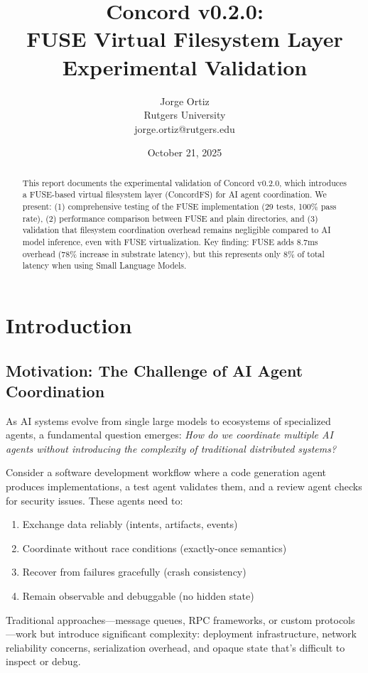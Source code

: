 \documentclass[11pt]{article}
\title{\textbf{Concord v0.2.0:\\FUSE Virtual Filesystem Layer\\Experimental Validation}}
\author{Jorge Ortiz\\Rutgers University\\jorge.ortiz@rutgers.edu}
\date{October 21, 2025}
\begin{document}
\maketitle

\begin{abstract}
This report documents the experimental validation of Concord v0.2.0, which introduces a FUSE-based virtual filesystem layer (ConcordFS) for AI agent coordination. We present: (1) comprehensive testing of the FUSE implementation (29 tests, 100\% pass rate), (2) performance comparison between FUSE and plain directories, and (3) validation that filesystem coordination overhead remains negligible compared to AI model inference, even with FUSE virtualization. Key finding: FUSE adds 8.7ms overhead (78\% increase in substrate latency), but this represents only 8\% of total latency when using Small Language Models.
\end{abstract}

\tableofcontents
\newpage

\section{Introduction}

\subsection{Motivation: The Challenge of AI Agent Coordination}

As AI systems evolve from single large models to ecosystems of specialized agents, a fundamental question emerges: \textit{How do we coordinate multiple AI agents without introducing the complexity of traditional distributed systems?}

Consider a software development workflow where a code generation agent produces implementations, a test agent validates them, and a review agent checks for security issues. These agents need to:
\begin{enumerate}
\item Exchange data reliably (intents, artifacts, events)
\item Coordinate without race conditions (exactly-once semantics)
\item Recover from failures gracefully (crash consistency)
\item Remain observable and debuggable (no hidden state)
\end{enumerate}

Traditional approaches---message queues, RPC frameworks, or custom protocols---work but introduce significant complexity: deployment infrastructure, network reliability concerns, serialization overhead, and opaque state that's difficult to inspect or debug.
\end{document}
